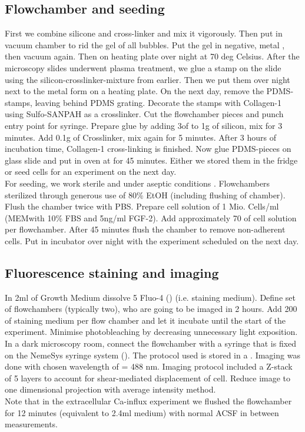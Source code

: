 \subsection{Flowchamber and seeding}

First we combine silicone  and cross-linker  and mix it vigorously. Then put in vacuum chamber to rid the gel of all bubbles. Put the gel in negative, metal , then vacuum again. Then on heating plate over night at 70 deg Celsius. After the microscopy slides underwent plasma treatment, we glue a stamp on the slide using the silicon-crosslinker-mixture from earlier. Then we put them over night next to the metal form on a heating plate. On the next day, remove the PDMS-stamps, leaving behind PDMS grating. Decorate the stamps with Collagen-1  using Sulfo-SANPAH as a crosslinker. Cut the flowchamber pieces and punch entry point for syringe. Prepare glue by adding 3\mul of  to 1g of silicon, mix for 3 minutes. Add 0.1g of Crosslinker, mix again for 5 minutes. After 3 hours of incubation time, Collagen-1 cross-linking is finished. Now glue PDMS-pieces on glass slide and put in oven at  for 45 minutes. Either we stored them in the fridge or seed cells for an experiment on the next day.\\
For seeding, we work sterile and under aseptic conditions . Flowchambers sterilized through generous use of 80\% EtOH (including flushing of chamber). Flush the chamber twice with PBS. Prepare cell solution of 1 Mio. Cells/ml (MEM\textalpha{ }with 10\% FBS and 5ng/ml FGF-2). Add approximately 70 \mul of cell solution per flowchamber. After 45 minutes flush the chamber to remove non-adherent cells. Put in incubator over night with the experiment scheduled on the next day.

\subsection{Fluorescence staining and imaging}
In 2ml of Growth Medium dissolve 5\mul{} Fluo-4 () (i.e. staining medium). Define set of flowchambers (typically two), who are going to be imaged in 2 hours. Add 200\mul{} of staining medium per flow chamber and let it incubate until the start of the experiment. Minimise photobleaching by decreasing unnecessary light exposition. In a dark microscopy room, connect the flowchamber with a syringe that is fixed on the NemeSys syringe system (). The protocol used is stored in a \myworries{}. Imaging was done with chosen wavelength of \textlambda = 488 nm.  Imaging protocol included a Z-stack of 5 layers to account for shear-mediated displacement of cell. Reduce image to one dimensional projection with average intensity method.  \\
Note that in the extracellular Ca-influx experiment we flushed the flowchamber for 12 minutes (equivalent to 2.4ml medium) with normal ACSF in between measurements.

